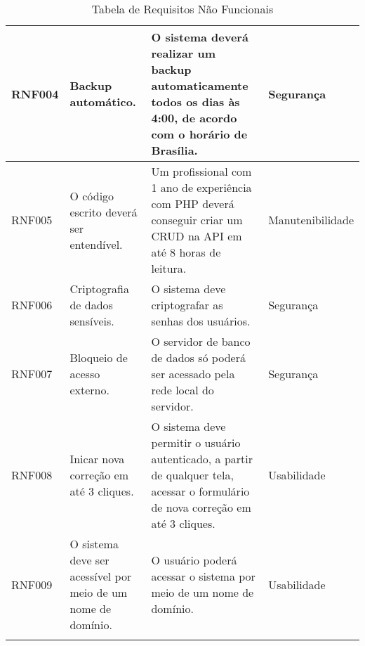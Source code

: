 \begin{landscape}
\begin{longtable}{|p{1.5cm}|p{4.5cm}|p{10cm}|p{3cm}|}
    RNF004 & Backup automático.                                           & O sistema deverá realizar um backup automaticamente todos os dias às 4:00, de acordo com o horário de Brasília.                   & Segurança        \\\hline
    RNF005 & O código escrito deverá ser entendível.                      & Um profissional com 1 ano de experiência com PHP deverá conseguir criar um CRUD na API em até 8 horas de leitura.                 & Manutenibilidade \\\hline
    RNF006 & Criptografia de dados sensíveis.                             & O sistema deve criptografar as senhas dos usuários.                                                                               & Segurança        \\\hline
    RNF007 & Bloqueio de acesso externo.                                  & O servidor de banco de dados só poderá ser acessado pela rede local do servidor.                                                  & Segurança        \\\hline
    RNF008 & Inicar nova correção em até 3 cliques.                       & O sistema deve permitir o usuário autenticado, a partir de qualquer tela, acessar o formulário de nova correção em até 3 cliques. & Usabilidade      \\\hline
    RNF009 & O sistema deve ser acessível por meio de um nome de domínio. & O usuário poderá acessar o sistema por meio de um nome de domínio.                                                                & Usabilidade      \\\hline
    \caption{Tabela de Requisitos Não Funcionais}
    \label{rnf:tabela}
\end{longtable}
\end{landscape}
